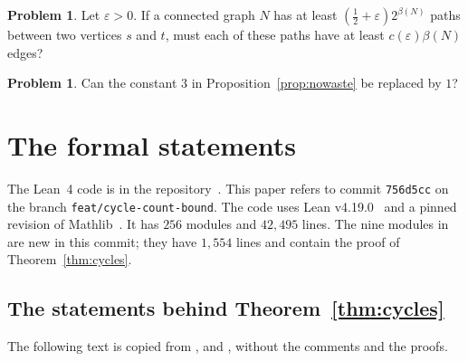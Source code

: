 \documentclass[11pt]{article}
\theoremstyle{definition}
\newtheorem{problem}[theorem]{Problem}
\theoremstyle{remark}
\newcommand{\half}{\tfrac12}
\begin{document}
\begin{problem}
Let $\varepsilon>0$. If a connected graph $N$ has at least $(\half+\varepsilon)2^{\beta(N)}$ paths
between two vertices $s$ and $t$, must each of these paths have at least $c(\varepsilon)\beta(N)$
edges?
\end{problem}

\begin{problem}
Can the constant $3$ in Proposition~\ref{prop:nowaste} be replaced by $1$?
\end{problem}

\appendix

\section{The formal statements}\label{app:lean}

The Lean~4 code is in the repository~\cite{Repo}. This paper refers to commit
\texttt{756d5cc} on the branch \texttt{feat/cycle-count-bound}. The
code uses Lean v4.19.0~\cite{Lean4} and a pinned revision of Mathlib~\cite{Mathlib}. It has $256$
modules and $42{,}495$ lines. The nine modules in  are new in this
commit; they have $1{,}554$ lines and contain the proof of Theorem~\ref{thm:cycles}.

\subsection{The statements behind Theorem~\ref{thm:cycles}}

The following text is copied from ,
 and , without the comments and the proofs.
\end{document}
